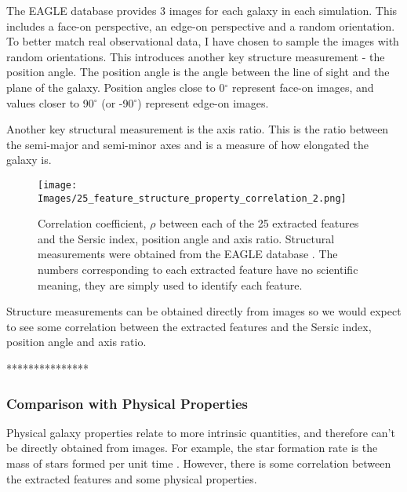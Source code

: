 \documentclass[12pt, onecolumn]{article}
\begin{document}
        The EAGLE database \cite{eagle_catalogue_public_release} provides 3 images for each galaxy in each simulation. This includes a face-on perspective, an edge-on perspective and a random orientation. To better match real observational data, I have chosen to sample the images with random orientations. This introduces another key structure measurement - the position angle. The position angle is the angle between the line of sight and the plane of the galaxy. Position angles close to 0$^{\circ}$ represent face-on images, and values closer to 90$^{\circ}$ (or -90$^{\circ}$) represent edge-on images.

        Another key structural measurement is the axis ratio. This is the ratio between the semi-major and semi-minor axes and is a measure of how elongated the galaxy is.


        \begin{figure}[H]
            \centering
            \texttt{[image: Images/25\_feature\_structure\_property\_correlation\_2.png]}
            \caption{Correlation coefficient, $\rho$ between each of the 25 extracted features and the Sersic index, position angle and axis ratio. Structural measurements were obtained from the EAGLE database \cite{eagle_catalogue_public_release}. The numbers corresponding to each extracted feature have no scientific meaning, they are simply used to identify each feature.}
            \label{structure_correlation}
        \end{figure}

        
        Structure measurements can be obtained directly from images so we would expect to see some correlation between the extracted features and the Sersic index, position angle and axis ratio.

        ***************

        


        

        \subsubsection{Comparison with Physical Properties}
        \label{physical_propeties}

        Physical galaxy properties relate to more intrinsic quantities, and therefore can't be directly obtained from images. For example, the star formation rate is the mass of stars formed per unit time \cite{sfr_definition}. However, there is some correlation between the extracted features and some physical properties.
\end{document}
